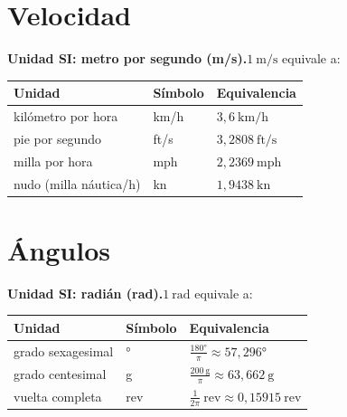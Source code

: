 \documentclass[12pt, letterpaper]{article}
\begin{document}
\section{Velocidad}

\begin{cuadroteoria}
    \textbf{Unidad SI: metro por segundo (m/s).}\quad $1\ \text{m/s}$ equivale a:
    \begin{center}
        \begin{tabular}{lll}
            \toprule
            \textbf{Unidad}        & \textbf{Símbolo} & \textbf{Equivalencia}   \\
            \midrule
            kilómetro por hora     & km/h             & $3{,}6\ \text{km/h}$    \\
            pie por segundo        & ft/s             & $3{,}2808\ \text{ft/s}$ \\
            milla por hora         & mph              & $2{,}2369\ \text{mph}$  \\
            nudo (milla náutica/h) & kn               & $1{,}9438\ \text{kn}$   \\
            \bottomrule
        \end{tabular}
    \end{center}
\end{cuadroteoria}
\newpage

\section{Ángulos}

\begin{cuadroteoria}
    \textbf{Unidad SI: radián (rad).}\quad $1\ \text{rad}$ equivale a:
    \begin{center}
        \begin{tabular}{lll}
            \toprule
            \textbf{Unidad}   & \textbf{Símbolo} & \textbf{Equivalencia}                                      \\
            \midrule
            grado sexagesimal & °                & $\frac{180°}{\pi} \approx 57{,}296°$                       \\[6pt]
            grado centesimal  & g                & $\frac{200\ \text{g}}{\pi} \approx 63{,}662\ \text{g}$     \\[6pt]
            vuelta completa   & rev              & $\frac{1}{2\pi}\ \text{rev} \approx 0{,}15915\ \text{rev}$ \\
            \bottomrule
        \end{tabular}
    \end{center}
\end{cuadroteoria}
\end{document}
